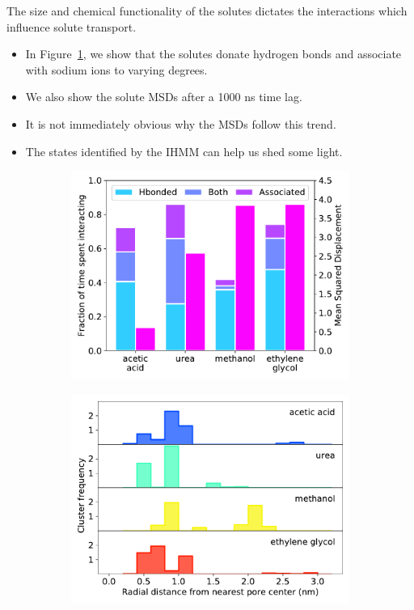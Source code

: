 \documentclass{article}
\begin{document}
  The size and chemical functionality of the solutes dictates the interactions which
  influence solute transport. 
  \begin{itemize}  
    \item In Figure~\ref{fig:hbonds_assoc_summary}, we show that the solutes 
    donate hydrogen bonds and associate with sodium ions to varying degrees.
    \item We also show the solute MSDs after a 1000 ns time lag. 
    \item It is not immediately obvious why the MSDs follow this trend.
    \item The states identified by the IHMM can help us shed some light.
  \end{itemize}
  
  \begin{figure}
  \centering
  \begin{subfigure}{0.45\textwidth}
  \includegraphics[width=\textwidth]{hbonds_assoc_summary.pdf}
  \caption{}\label{fig:hbonds_assoc_summary}
  \end{subfigure}
  \begin{subfigure}{0.45\textwidth}
  \includegraphics[width=\textwidth]{rdf_summary.pdf}

\end{subfigure}
\end{figure}
\end{document}
